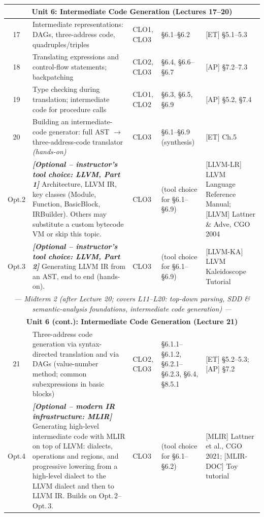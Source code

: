 \documentclass{article}
\begin{document}
\begin{longtable}{|c|p{5.1cm}|p{1.1cm}|p{2.5cm}|p{3.3cm}|}
\multicolumn{5}{|c|}{\cellcolor{gray!20}\textbf{Unit 6: Intermediate Code Generation (Lectures 17--20)}} \\ \hline
17 & Intermediate representations: DAGs, three-address code, quadruples/triples & CLO1, CLO3 & \S6.1--\S6.2 & [ET] \S5.1--5.3 \\ \hline
18 & Translating expressions and control-flow statements; backpatching & CLO2, CLO3 & \S6.4, \S6.6--\S6.7 & [AP] \S7.2--7.3 \\ \hline
19 & Type checking during translation; intermediate code for procedure calls & CLO1, CLO2 & \S6.3, \S6.5, \S6.9 & [AP] \S5.2, \S7.4 \\ \hline
20 & Building an intermediate-code generator: full AST $\to$ three-address-code translator \emph{(hands-on)} & CLO3 & \S6.1--\S6.9 (synthesis) & [ET] Ch.5 \\ \hline
\rowcolor{blue!8}
Opt.2 & \emph{\textbf{[Optional -- instructor's tool choice: LLVM, Part 1]}} Architecture, LLVM IR, key classes (Module, Function, BasicBlock, IRBuilder). Others may substitute a custom bytecode VM or skip this topic. & CLO3 & (tool choice for \S6.1--\S6.9) & [LLVM-LR] LLVM Language Reference Manual; [LLVM] Lattner \& Adve, CGO 2004 \\ \hline
\rowcolor{blue!8}
Opt.3 & \emph{\textbf{[Optional -- instructor's tool choice: LLVM, Part 2]}} Generating LLVM IR from an AST, end to end (hands-on). & CLO3 & (tool choice for \S6.1--\S6.9) & [LLVM-KA] LLVM Kaleidoscope Tutorial \\ \hline

\multicolumn{5}{|c|}{\cellcolor{yellow!25}\textit{--- Midterm 2 (after Lecture 20; covers L11--L20: top-down parsing, SDD \& semantic-analysis foundations, intermediate code generation) ---}} \\ \hline

\multicolumn{5}{|c|}{\cellcolor{gray!20}\textbf{Unit 6 (cont.): Intermediate Code Generation (Lecture 21)}} \\ \hline
21 & Three-address code generation via syntax-directed translation and via DAGs (value-number method; common subexpressions in basic blocks) & CLO2, CLO3 & \S6.1.1--\S6.1.2, \S6.2.1--\S6.2.3, \S6.4, \S8.5.1 & [ET] \S5.2--5.3; [AP] \S7.2 \\ \hline
\rowcolor{blue!8}
Opt.4 & \emph{\textbf{[Optional -- modern IR infrastructure: MLIR]}} Generating high-level intermediate code with MLIR on top of LLVM: dialects, operations and regions, and progressive lowering from a high-level dialect to the LLVM dialect and then to LLVM IR. Builds on Opt.\,2--Opt.\,3. & CLO3 & (tool choice for \S6.1--\S6.2) & [MLIR] Lattner et al., CGO 2021; [MLIR-DOC] Toy tutorial \\ \hline


\end{longtable}
\end{document}
